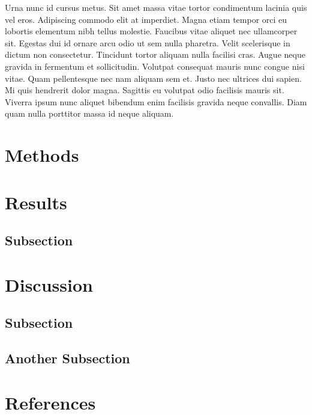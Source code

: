 \documentclass[
  11pt,
  twocolumn,
  twoside]{article}
\begin{document}
Urna nunc id cursus metus. Sit amet massa vitae tortor condimentum
lacinia quis vel eros. Adipiscing commodo elit at imperdiet. Magna etiam
tempor orci eu lobortis elementum nibh tellus molestie. Faucibus vitae
aliquet nec ullamcorper sit. Egestas dui id ornare arcu odio ut sem
nulla pharetra. Velit scelerisque in dictum non consectetur. Tincidunt
tortor aliquam nulla facilisi cras. Augue neque gravida in fermentum et
sollicitudin. Volutpat consequat mauris nunc congue nisi vitae. Quam
pellentesque nec nam aliquam sem et. Justo nec ultrices dui sapien. Mi
quis hendrerit dolor magna. Sagittis eu volutpat odio facilisis mauris
sit. Viverra ipsum nunc aliquet bibendum enim facilisis gravida neque
convallis. Diam quam nulla porttitor massa id neque aliquam.

\hypertarget{methods}{%
\section{Methods}\label{methods}}

\hypertarget{results}{%
\section{Results}\label{results}}

\hypertarget{subsection}{%
\subsection{Subsection}\label{subsection}}

\hypertarget{discussion}{%
\section{Discussion}\label{discussion}}

\hypertarget{subsection-1}{%
\subsection{Subsection}\label{subsection-1}}

\hypertarget{another-subsection}{%
\subsection{Another Subsection}\label{another-subsection}}

\hypertarget{references}{%
\section{References}\label{references}}
\end{document}
